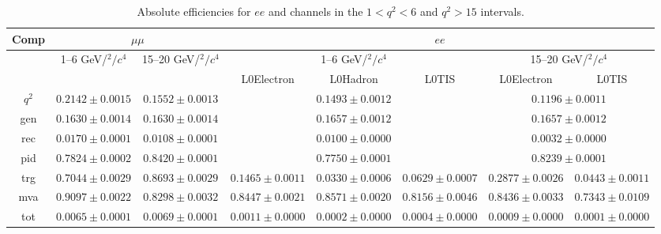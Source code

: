 \begin{landscape}

\begin{table}
\centering
\begin{tabular}{|c|c|c|c|c|c|c|c|}
\hline Comp 			&  \multicolumn {2}{c|}{$\mu\mu$} 				& \multicolumn {5}{c|}{$ee$} \\ \hline
			&  1--6 GeV/$^2/c^4$ 				& 15--20 GeV/$^2/c^4$  				& \multicolumn {3}{c|}{1--6 GeV/$^2/c^4$} 				& \multicolumn {2}{c|}{15--20 GeV/$^2/c^4$ }\\ \hline
				&  \multicolumn {2}{c|}{} &  L0Electron 	& L0Hadron 	& L0TIS 	& L0Electron 	& L0TIS \\ \hline
$q^2$  & $ 0.2142  \pm  0.0015 $ & $ 0.1552  \pm  0.0013 $ &  \multicolumn{3}{c|}{$ 0.1493  \pm  0.0012 $} & \multicolumn{2}{c|}{$ 0.1196  \pm  0.0011 $} \\
gen  & $ 0.1630  \pm  0.0014 $ & $ 0.1630  \pm  0.0014 $ &  \multicolumn{3}{c|}{$ 0.1657  \pm  0.0012 $} & \multicolumn{2}{c|}{$ 0.1657  \pm  0.0012 $} \\
rec  & $ 0.0170  \pm  0.0001 $ & $ 0.0108  \pm  0.0001 $ &  \multicolumn{3}{c|}{$ 0.0100  \pm  0.0000 $} & \multicolumn{2}{c|}{$ 0.0032  \pm  0.0000 $} \\
pid  & $ 0.7824  \pm  0.0002 $ & $ 0.8420  \pm  0.0001 $ &  \multicolumn{3}{c|}{$ 0.7750  \pm  0.0001 $} & \multicolumn{2}{c|}{$ 0.8239  \pm  0.0001 $} \\
\hline
trg  & $ 0.7044  \pm  0.0029 $ & $ 0.8693  \pm  0.0029 $ & $ 0.1465  \pm  0.0011 $ & $ 0.0330  \pm  0.0006 $ & $ 0.0629  \pm  0.0007 $ & $ 0.2877  \pm  0.0026 $ & $ 0.0443  \pm  0.0011 $ \\
mva  & $ 0.9097  \pm  0.0022 $ & $ 0.8298  \pm  0.0032 $ & $ 0.8447  \pm  0.0021 $ & $ 0.8571  \pm  0.0020 $ & $ 0.8156  \pm  0.0046 $ & $ 0.8436  \pm  0.0033 $ & $ 0.7343  \pm  0.0109 $ \\
tot  & $ 0.0065  \pm  0.0001 $ & $ 0.0069  \pm  0.0001 $ & $ 0.0011  \pm  0.0000 $ & $ 0.0002  \pm  0.0000 $ & $ 0.0004  \pm  0.0000 $ & $ 0.0009  \pm  0.0000 $ & $ 0.0001  \pm  0.0000 $ \\
\hline
\end{tabular}
\caption{Absolute efficiencies for $ee$ and \mumu channels in the $1 < q^2 < 6$ and $q^2 > 15$ \gevgevcccc intervals.}
\label{tab:RKst_AbsEff}
\end{table}



\end{landscape}

